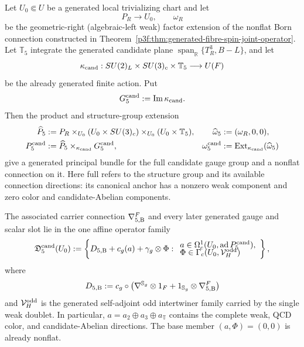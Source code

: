 \documentclass[11pt,a4paper]{article}
\begin{document}
\begin{theorem}
\label{p5:thm:canonical-full-joint-connection}
\label{p5:thm:joint5-occurrence-discharge}
Let \(U_0\Subset U\) be a generated local trivializing chart and let
\[
 P_R\longrightarrow U_0,\qquad \omega_R
\]
be the geometric-right (algebraic-left weak) factor extension of the nonflat Born connection constructed in
Theorem~\ref{p3f:thm:generated-fibre-spin-joint-operator}.  Let
\(\mathbb T_5\) integrate the generated candidate plane
\(\operatorname{span}_{\mathbb R}\{T_R^3,B-L\}\), and let
\[
 \kappa_{\rm cand}:
 SU(2)_L\times SU(3)_c\times\mathbb T_5
 \longrightarrow U(F)
\]
be the already generated finite action.  Put
\[
 G_5^{\rm cand}:=\operatorname{Im}\kappa_{\rm cand}.
\]
Then the product and structure-group extension
\begin{align}
\widehat P_5
 &:=
 P_R\times_{U_0}(U_0\times SU(3)_c)
     \times_{U_0}(U_0\times\mathbb T_5),
&
\widehat\omega_5&:=(\omega_R,0,0),\label{p5:eq:candidate-product-connection}\\
P_5^{\rm cand}
 &:=
 \widehat P_5\times_{\kappa_{\rm cand}}G_5^{\rm cand},
&
\omega_5^{\rm cand}
 &:=
 \operatorname{Ext}_{\kappa_{\rm cand}}(\widehat\omega_5)
\label{p5:eq:candidate-full-bundle}
\end{align}
give a generated principal bundle for the full candidate gauge group and a
nonflat connection on it.  Here full refers to the structure group and its
available connection directions: its canonical anchor has a nonzero weak
component and zero color and candidate-Abelian components.

The associated carrier connection \(\nabla_{5,{\rm B}}^F\) and every later
generated gauge and scalar slot lie in the one affine operator family
\begin{equation}
\label{p5:eq:full-joint-dirac-family}
\mathfrak D_5^{\rm cand}(U_0)
:=
\left\{
D_{5,{\rm B}}+c_g(a)+\gamma_g\otimes\Phi:
\begin{array}{l}
a\in\Omega_c^1(U_0,\operatorname{ad}P_5^{\rm cand}),\\[-1mm]
\Phi\in\Gamma_c(U_0,\mathcal V_H^{\rm odd})
\end{array}
\right\},
\end{equation}
where
\[
D_{5,{\rm B}}
:=
c_g\circ
\left(\nabla^{\mathbb S_g}\otimes1_F+
1_{\mathbb S_g}\otimes\nabla_{5,{\rm B}}^F\right)
\]
and \(\mathcal V_H^{\rm odd}\) is the generated self-adjoint odd
intertwiner family carried by the single weak doublet.  In particular,
\(a=a_2\oplus a_3\oplus a_{\mathbb T}\) contains the complete weak, QCD
color, and candidate-Abelian directions.  The base member
\((a,\Phi)=(0,0)\) is already nonflat.


\end{theorem}
\end{document}
